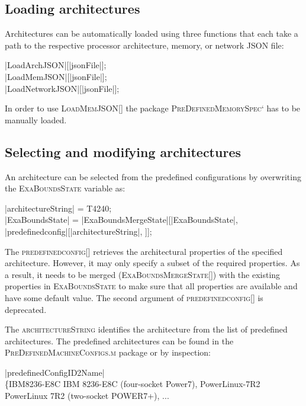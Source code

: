 \subsection{Loading architectures}

Architectures can be automatically loaded using three functions that each take a path to the respective processor architecture, memory, or network JSON file:
\begin{mma}
\In |LoadArchJSON|[|jsonFile|]; \\
\In |LoadMemJSON|[|jsonFile|]; \\
\In |LoadNetworkJSON|[|jsonFile|]; \\
\end{mma}

In order to use \textsc{LoadMemJSON[]} the package \textsc{PreDefinedMemorySpec`} has to be manually loaded.

\subsection{Selecting and modifying architectures}

An architecture can be selected from the predefined configurations by overwriting the \textsc{ExaBoundsState} variable as:
\begin{mma}
  \In |architectureString| = T4240; \\
  \In |ExaBoundsState| = |ExaBoundsMergeState|[|ExaBoundsState|, \linebreak |predefinedconfig|[|architectureString|, ]]; \\
\end{mma}

The \textsc{predefinedconfig[]} retrieves the architectural properties of the specified architecture. However, it may only specify a subset of the required properties. As a result, it needs to be merged (\textsc{ExaBoundsMergeState[]}) with the existing properties in \textsc{ExaBoundsState} to make sure that all properties are available and have some default value. The second argument of \textsc{predefinedconfig[]} is deprecated.

The \textsc{architectureString} identifies the architecture from the list of predefined architectures. The predefined architectures can be found in the \textsc{PreDefinedMachineConfigs.m} package or by inspection:
\begin{mma}
  \In |predefinedConfigID2Name| \\
  \Out \{IBM8236-E8C \rightarrow {}IBM 8236-E8C (four-socket Power7), \linebreak{}PowerLinux-7R2 \rightarrow {}PowerLinux 7R2 (two-socket POWER7+), ... \\
\end{mma}

